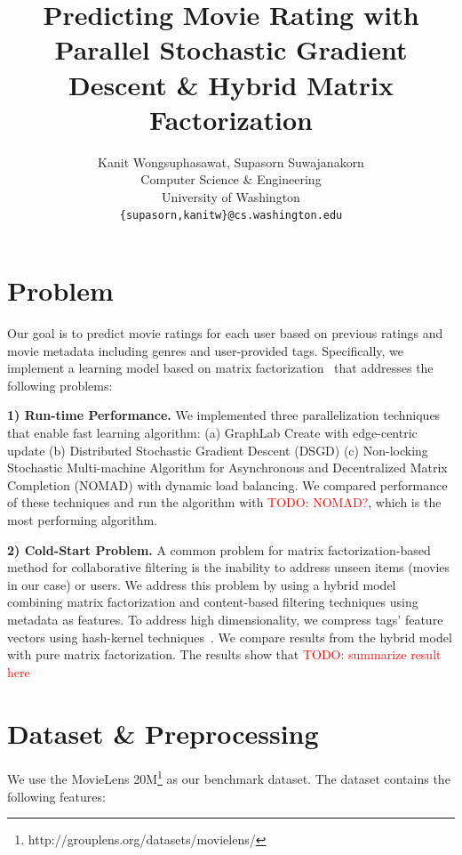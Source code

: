 \documentclass{article} %
\title{Predicting Movie Rating with Parallel Stochastic Gradient Descent \& Hybrid Matrix Factorization}
\author{
Kanit Wongsuphasawat, Supasorn Suwajanakorn \\
Computer Science \& Engineering\\
University of Washington\\
\texttt{\{supasorn,kanitw\}@cs.washington.edu} \\
}
\newcommand{\todo}[1]{\textcolor{red}{TODO: #1}}
\begin{document}
\maketitle



\section{Problem}

Our goal is to predict movie ratings for each user based on previous ratings
and movie metadata including genres and user-provided tags.
Specifically, we implement a learning model based on matrix
factorization~\cite{koren:matrix} that addresses the following problems:

\textbf{1) Run-time Performance.}
We implemented three parallelization techniques that enable fast
learning algorithm:
(a) GraphLab Create with edge-centric update
(b) Distributed Stochastic Gradient Descent (DSGD)
(c) Non-locking Stochastic Multi-machine Algorithm for Asynchronous and Decentralized Matrix Completion (NOMAD) with dynamic load balancing.
We compared performance of these techniques and run the algorithm with
\todo{NOMAD?}, which is the most performing algorithm.


\textbf{2) Cold-Start Problem.}
A common problem for matrix factorization-based method for collaborative
filtering is the inability to address unseen items (movies in our case) or
users.  We address this problem by using a hybrid model combining matrix
factorization and content-based filtering techniques using metadata as
features. To address high dimensionality, we compress tags' feature vectors
using hash-kernel techniques~\cite{shi:hashkernels}.  We compare results
from the hybrid model with pure matrix factorization.  The results show that \todo{summarize result here}


\section{Dataset \& Preprocessing}

We use the MovieLens 20M\footnote{http://grouplens.org/datasets/movielens/}
as our benchmark dataset.  The dataset contains the following features:
\end{document}
